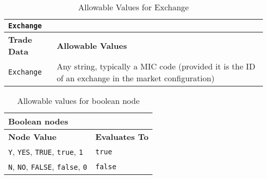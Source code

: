 \begin{table}[H]
\centering
  \begin{tabular} {|p{3cm}|p{12cm}|}
    \hline
    \multicolumn{2}{|l|}{\tt Exchange} \\ \hline
    \bfseries{Trade Data} & \bfseries{Allowable Values} \\
    \hline
    \lstinline!Exchange!  & Any string, typically a MIC code (provided it is the ID of an exchange in the market configuration) \\
    \hline
  \end{tabular}
  \caption{Allowable Values for Exchange}
  \label{tab:mic}
\end{table}

\begin{table}[H]
\centering
  \begin{tabular} {|l|l|}
    \hline
    \multicolumn{2}{|l|}{Boolean nodes} \\
    \hline
    \textbf{Node Value} & \textbf{Evaluates To} \\
    \hline
    \lstinline!Y!, \lstinline!YES!, \lstinline!TRUE!, \lstinline!true!, \lstinline!1! & \lstinline!true! \\
    \hline
    \lstinline!N!, \lstinline!NO!, \lstinline!FALSE!, \lstinline!false!, \lstinline!0! & \lstinline!false! \\
    \hline
  \end{tabular}
  \caption{Allowable values for boolean node}
  \label{tab:boolean_allowable}
\end{table}
